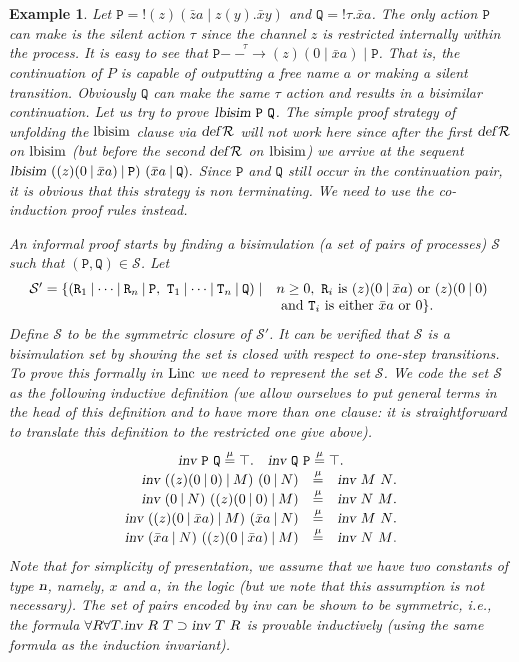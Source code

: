 \documentclass{acmtrans2m}
\newenvironment{example}{\begin{exa} \rm}{\end{exa}}
\newtheorem{exa}[theorem]{Example}
\def\Sscr{{\mathcal S}}
\def\Ppi{{\mathtt P}}
\def\Qpi{{\mathtt Q}}
\def\Rpi{{\mathtt R}}
\def\Tpi{{\mathtt T}}
\newcommand{\Linc}{{\rm Linc}}
\newcommand{\lbisim}[2]{\hbox{\sl lbisim}~#1~#2}
\newcommand{\defR}{\hbox{\sl def\/{}}{\cal R}}
\newcommand{\defmu}{\mathrel{\stackrel{\mu}{=}}}
\newcommand{\name}{\hbox{\sl n}}
\newcommand{\oimp}{\supset}
\newcommand{\one  }[3]{#1\stackrel{#2}{-\!\!-\!\!\!\rightarrow    } #3}
\newcommand{\barpi}{\mathbin{|}}
\begin{document}
\begin{example}
Let $\Ppi = !(z)(\bar{z}a \barpi  z(y).\bar{x}y)$ and $\Qpi = !\tau.\bar{x}a$.
The only action $\Ppi$ can make is the silent action $\tau$ since
the channel $z$ is restricted internally within the process.
It is easy to see that $\one{\Ppi}{\tau}{(z)(0 \barpi \bar{x}a) \barpi  \Ppi}$.
That is, the continuation of $P$ is capable of outputting a free name $a$
or making a silent transition.
Obviously $\Qpi$ can make the same $\tau$ action and results in 
a bisimilar continuation.
Let us try to prove $\lbisim \Ppi \Qpi$.
The simple proof strategy of unfolding the
$\hbox{lbisim}$ clause via $\defR$ will not work here since
after the first $\defR$ on $\hbox{lbisim}$ 
(but before the second $\defR$ on $\hbox{lbisim}$) 
we arrive at the sequent 
$
\lbisim{((z)(0\barpi \bar{x}a) \barpi  \Ppi)}{(\bar{x}a \barpi  \Qpi).}
$
Since $\Ppi$ and $\Qpi$ still occur in the continuation pair,
it is obvious that this strategy is non terminating. 
We need to use the co-induction proof rules instead.

An informal proof starts by 
finding a bisimulation (a set of pairs of processes) $\Sscr$ such that
$(\Ppi,\Qpi) \in \Sscr$. 
Let 
$$
\begin{array}{ll}
\Sscr' = \{(\Rpi_1\barpi \cdots\barpi \Rpi_n\barpi \Ppi, ~ \Tpi_1\barpi \cdots\barpi \Tpi_n\barpi \Qpi) 
    \mid & n \geq 0, \hbox{ $\Rpi_i$ is $(z)(0 \barpi  \bar{x}a)$ or $(z)(0 \barpi  0)$ } \\
 & \hbox{ and $\Tpi_i$ is either $\bar{x}a$ or $0$} \}.
\end{array}
$$
Define $\Sscr$ to be the symmetric closure of $\Sscr'$. 
It can be verified that $\Sscr$ is a bisimulation set by showing the set is
closed with respect to one-step transitions. To prove this formally
in $\Linc$ we need to represent the set $\Sscr$.
We code the set $\Sscr$ as the following inductive definition
(we allow ourselves to put general terms in the head of this
definition and to have more than one clause: it is straightforward to
translate this definition to the restricted one give above).
\newcommand\invar[2]{{\hbox{\sl inv}~#1~#2}}
$$
\begin{array}{rcl}
\multicolumn{3}{c}{\invar \Ppi \Qpi  \defmu  \top. \quad \invar \Qpi \Ppi \defmu \top.}\\
\invar{((z)(0\barpi 0)\barpi M)}{(0\barpi N)} & \defmu & \invar M N. \\
\invar{(0\barpi N)}{((z)(0\barpi 0)\barpi M)} & \defmu & \invar N M.\\ 
\invar{((z)(0\barpi \bar{x}a) \barpi  M)}{(\bar{x}a \barpi  N)} & \defmu & \invar M N. \\
\invar{(\bar{x}a \barpi  N)}{((z)(0\barpi \bar{x}a) \barpi  M)} & \defmu & \invar N M. 
\end{array}
$$
Note that for simplicity of presentation, we assume that we have two
constants of type $\name$, namely, $x$ and $a$, in the logic (but we note that
this assumption is not necessary). 
The set of pairs encoded by {\sl inv} can be shown to be symmetric,
i.e., the formula $\forall R\forall T.\invar{R}{T} \oimp \invar{T}{R}$ is provable
inductively (using the same formula as the induction invariant).


\end{example}
\end{document}
